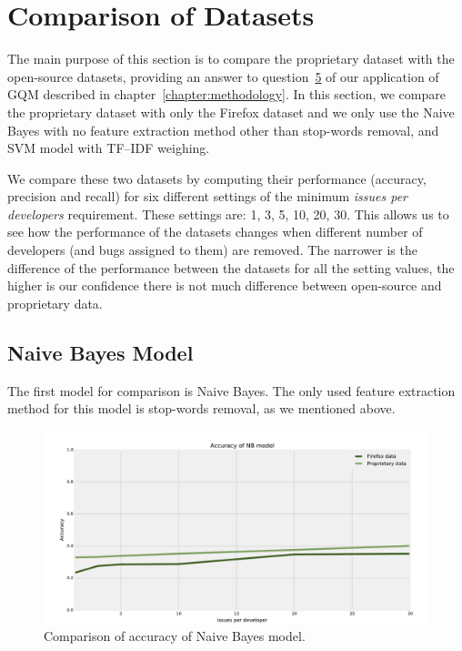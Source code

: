 \section{Comparison of Datasets}
\label{section:comparison-of-datasets}

The main purpose of this section is to compare the proprietary dataset with the open-source datasets, providing an answer to question~\hyperlink{question:5}{5} of our application of GQM described in chapter~\ref{chapter:methodology}. In this section, we compare the proprietary dataset with only the Firefox dataset and we only use the Naive Bayes with no feature extraction method other than stop-words removal, and SVM model with TF--IDF weighing.

We compare these two datasets by computing their performance (accuracy, precision and recall) for six different settings of the minimum \textit{issues per developers} requirement. These settings are: 1, 3, 5, 10, 20, 30. This allows us to see how the performance of the datasets changes when different number of developers (and bugs assigned to them) are removed. The narrower is the difference of the performance between the datasets for all the setting values, the higher is our confidence there is not much difference between open-source and proprietary data.

\subsection{Naive Bayes Model}

The first model for comparison is Naive Bayes. The only used feature extraction method for this model is stop-words removal, as we mentioned above.

\begin{figure}[htbp]
    \centering
        \includegraphics[width=\textwidth]{./images/prop_vs_os/nb_accuracy.pdf}
    \caption{Comparison of accuracy of Naive Bayes model.}
    \label{fig:results.datasets.nb_accuracy}
\end{figure}


